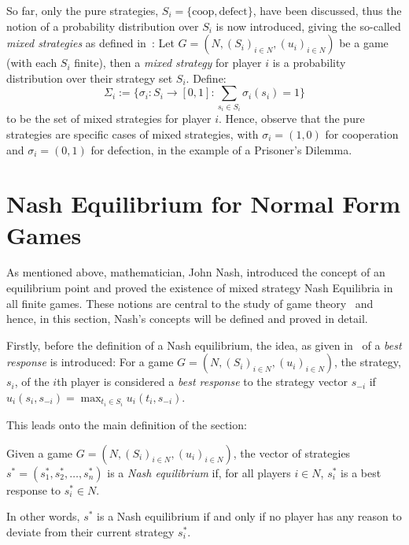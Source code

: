 So far, only the pure strategies, \(S_{i}=\{\text{coop}, \text{defect}\}\), have
been discussed, thus the notion of a probability distribution over \(S_{i}\) is
now introduced, giving the so-called \textit{mixed strategies} as defined in~\cite{maschler_solan_zamir_2013}:
Let \(G=(N, (S_{i})_{i \in N}, (u_{i})_{i \in N})\) be a game (with each \(S_{i}\)
finite), then a \textit{mixed strategy} for player \(i\) is a probability
distribution over their strategy set \(S_{i}\). Define:
\[
\Sigma_{i} := \{\sigma_{i} : S_{i} \to [0, 1] : \sum_{s_{i} \in S_{i}}{\sigma_{i}(s_{i})} = 1\}   
\]
to be the set of mixed strategies for player \(i\). Hence, observe that the pure
strategies are specific cases of mixed strategies, with \(\sigma_{i} = (1, 0)\)
for cooperation and \(\sigma_{i} = (0, 1)\) for defection, in the example of a
Prisoner's Dilemma.


\section{Nash Equilibrium for Normal Form Games}\label{sec:NE_for_Normal_Form_Games}
As mentioned above, mathematician, John Nash, introduced the concept of an
equilibrium point and proved the existence of mixed strategy Nash Equilibria in
all finite games. These notions are central to the study of game
theory~\cite{maschler_solan_zamir_2013} and hence, in this section, Nash's
concepts will be defined and proved in detail.

Firstly, before the definition of a Nash equilibrium, the idea, as given in~
\cite{maschler_solan_zamir_2013} of a \textit{best response} is introduced:
For a game \(G=(N, (S_{i})_{i \in N}, (u_{i})_{i \in N})\), the strategy,
\(s_{i}\), of the \(i\)th player is considered a \textit{best response} to the
strategy vector \(s_{-i}\) if \(u_{i}(s_{i}, s_{-i}) = \max_{t_{i} \in
S_{i}}u_{i}(t_{i}, s_{-i})\).

This leads onto the main definition of the section:
\begin{definition}\label{def:NE}
    Given a game \(G=(N, (S_{i})_{i \in N}, (u_{i})_{i \in N})\), the vector of
    strategies \(s^{*} = (s_{1}^{*}, s_{2}^{*}, \ldots, s_{n}^{*})\) is a
    \textit{Nash equilibrium} if, for all players \(i \in N\), \(s_{i}^{*}\) is a best response to \(s_{i}^{*} \in N\).~\cite{maschler_solan_zamir_2013}
\end{definition}
In other words, \(s^{*}\) is a Nash equilibrium if and only if no player has any
reason to deviate from their current strategy \(s_{i}^{*}\).

